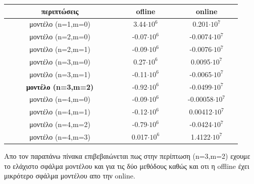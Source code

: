 \documentclass{article}
\begin{document}
\begin{center}
\begin{tabular}{ |c|c|c| } 
 \hline
$\qquad$ $\qquad$ περιπτώσεις $\qquad$ $\qquad$ &$\qquad$ ofline $\qquad$& $\qquad$ online $\qquad$ \\ 
  \hline
 μοντέλο (n=1,m=0) & 3.44$\cdot 10^6$ &  0.201$\cdot 10^7$ \\ 
  \hline
  μοντέλο (n=2,m=0) & -0.07$\cdot 10^6$ & -0.0074$\cdot 10^7$ \\ 
  \hline
 μοντέλο (n=2,m=1) & -0.09$\cdot 10^6$ & -0.0076$\cdot 10^7$ \\ 
  \hline
 μοντέλο (n=3,m=0) & 0.27$\cdot 10^6$ &  0.0095$\cdot 10^7$ \\ 
  \hline
 μοντέλο (n=3,m=1) & -0.11$\cdot 10^6$ & -0.0065$\cdot 10^7$ \\ 
  \hline
\textbf{  μοντέλο (n=3,m=2)} & -0.92$\cdot 10^6$ &   -0.0499$\cdot 10^7$ \\ 
  \hline
μοντέλο (n=4,m=0)& -0.09$\cdot 10^6$ & -0.00058$\cdot 10^7$ \\ 
  \hline
 μοντέλο (n=4,m=1) & -0.12$\cdot 10^6$ & 0.00412$\cdot 10^7$ \\ 
  \hline
 μοντέλο (n=4,m=2)& -0.79$\cdot 10^6$ & -0.0424$\cdot 10^7$ \\ 
  \hline
 μοντέλο (n=4,m=3)& 0.017$\cdot 10^6$ & 1.4122$\cdot 10^7$ \\ 
  \hline
\end{tabular}
\end{center}
   
Απο τον παραπάνω πίνακα επιβεβαιώνεται πως στην περίπτωση (n=3,m=2) εχουμε το ελάχιστο σφάλμα μοντέλου και για τις δύο μεθόδους καθώς και οτι η offline έχει μικρότερο σφάλμα μοντέλου απο την online.
\end{document}
